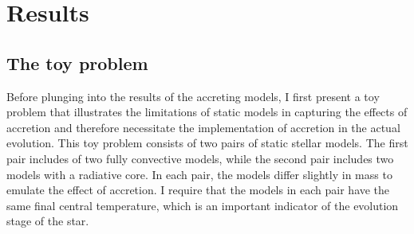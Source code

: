 \documentclass[12pt,a4paper]{article}
\newenvironment{outline}[1]{%
  \begin{itemize}[label=\textbullet]%
  \color{#1}%
}{%
  \end{itemize}%
}
\begin{document}

\section{Results}
\label{sec:results}

\subsection{The toy problem}
\label{sec:toy_problem}

Before plunging into the results of the accreting models, I first present a toy problem that illustrates the limitations of static models in capturing the effects of accretion and therefore necessitate the implementation of accretion in the actual evolution. This toy problem consists of two pairs of static stellar models. The first pair includes of two fully convective models, while the second pair includes two models with a radiative core. In each pair, the models differ slightly in mass to emulate the effect of accretion. I require that the models in each pair have the same final central temperature, which is an important indicator of the evolution stage of the star.
\end{document}
